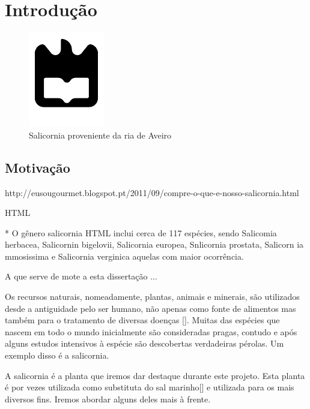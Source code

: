 \chapter{Introdução}




\begin{figure}[!htb]
\centering
\includegraphics{uaLogoNew.pdf}
\caption{Salicornia proveniente da ria de Aveiro}
\label{Rotulo}
\end{figure}



\section{Motivação}




http://eusougourmet.blogspot.pt/2011/09/compre-o-que-e-nosso-salicornia.html


\ac{HTML}



* O gênero salicornia \ac{HTML} inclui cerca de 117 espécies, sendo Salicomia herbacea, Salicornin bigelovii, Salicornia europea, Snlicornia prostata, Salicorn ia mmosissima e Salicornia verginica aquelas com maior ocorrência. \cite{overviewsal}  \cite{Saini2014}

A que serve de mote a esta dissertação ...




Os recursos naturais, nomeadamente, plantas, animais e minerais, são utilizados desde a antiguidade pelo ser humano, não apenas como fonte de alimentos mas também para o tratamento de diversas doenças []. Muitas das espécies que nascem em todo o mundo inicialmente são consideradas pragas, contudo e após alguns estudos intensivos à espécie são descobertas verdadeiras pérolas. Um exemplo disso é a salicornia.

A salicornia é a planta que iremos dar destaque durante este projeto. Esta planta é por vezes utilizada como substituta do sal marinho[] e utilizada para os mais diversos fins. Iremos abordar alguns deles mais à frente. 

